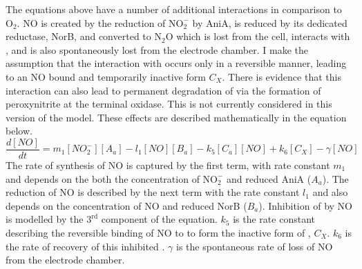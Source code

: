 The equations above have a number of additional interactions in comparison to $\mathrm{O}_2$. NO is created by the reduction of $\mathrm{NO}_\mathrm{2}^\mathrm{-}$ by AniA, is reduced by its dedicated reductase, NorB, and converted to $\mathrm{N}_2\mathrm{O}$ which is lost from the cell, interacts with \cbbthree{}, and is also spontaneously lost from the electrode chamber. I make the assumption that the interaction with \cbbthree{} occurs only in a reversible manner, leading to an NO bound and temporarily inactive form $C_X$. There is evidence that this interaction can also lead to permanent degradation of \cbbthree{} via the formation of peroxynitrite at the terminal oxidase. This is not currently considered in this version of the model. These effects are described mathematically in the equation below.
\begin{equation}
\frac{d[NO]}{dt} = m_{1}[NO_2^-][A_a] - l_1[NO][B_a] - k_5[C_a][NO] + k_6 [C_X] - \gamma[NO]
\label{eq:no}
\end{equation}
The rate of synthesis of NO is captured by the first term, with rate constant $m_{1}$ and depends on the both the concentration of $\mathrm{NO}_\mathrm{2}^\mathrm{-}$ and reduced AniA ($A_a$). The reduction of NO is described by the next term with the rate constant $l_1$ and also depends on the concentration of NO and reduced NorB ($B_a$). Inhibition of \cbbthree{} by NO is modelled by the $\mathrm{3}^\mathrm{rd}$ component of the equation. $k_5$ is the rate constant describing the reversible binding of NO to \cbbthree{} to form the inactive form of \cbbthree{}, $C_X$. $k_6$ is the rate of recovery of this inhibited \cbbthree{}. $\gamma$ is the spontaneous rate of loss of NO from the electrode chamber.\\
\\\\
